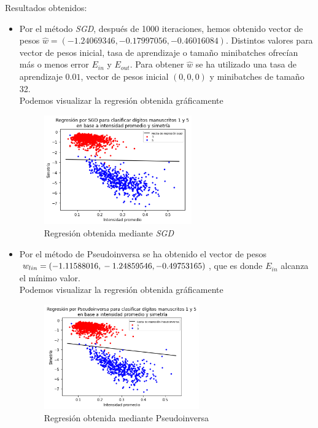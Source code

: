 \documentclass[11pt,a4paper]{article}
\theoremstyle{definition}
\begin{document}
	Resultados obtenidos:
	\begin{itemize}
		\item Por el método \textit{SGD}, después de 1000 iteraciones, hemos obtenido vector de pesos $\hat w=(-1.24069346, -0.17997056, -0.46016084)$. Distintos valores para vector de pesos inicial, tasa de aprendizaje o tamaño minibatches ofrecían más o menos error $E_{in}$ y $E_{out}$. Para obtener $\hat w$ se ha utilizado una tasa de aprendizaje $0.01$, vector de pesos inicial $(0,0,0)$ y minibatches de tamaño 32. \\
		Podemos visualizar la regresión obtenida gráficamente
		\begin{figure}[H]
		\centering
		\includegraphics[width=0.6\textwidth]{images/regre_SGD}
		\caption{Regresión obtenida mediante \textit{SGD}}
		\end{figure}
	
	\item Por el método de Pseudoinversa se ha obtenido el vector de pesos $w_{lin}=(-1.11588016,\\-1.24859546,-0.49753165)$, que es donde $E_{in}$ alcanza el mínimo valor.\\
	Podemos visualizar la regresión obtenida gráficamente
		\begin{figure}[H]
		\centering
		\includegraphics[width=0.63\textwidth]{images/regre_Pseudo}
		\caption{Regresión obtenida mediante Pseudoinversa}
		\end{figure}
	\end{itemize}
	
\end{document}
